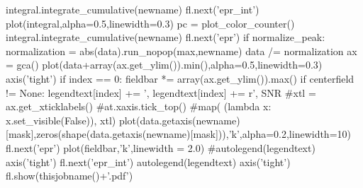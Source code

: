 \begin{tiny}
\begin{python}
   integral.integrate_cumulative(newname)
   fl.next('epr_int')
   plot(integral,alpha=0.5,linewidth=0.3)
   pc = plot_color_counter()
   integral.integrate_cumulative(newname)
   fl.next('epr')
   if normalize_peak:
      normalization = abs(data).run_nopop(max,newname)
      data /= normalization
   ax = gca()
   plot(data+array(ax.get_ylim()).min(),alpha=0.5,linewidth=0.3)
   axis('tight')
   if index == 0:
       fieldbar *= array(ax.get_ylim()).max()
   if centerfield != None:
      legendtext[index] += ', %
   legendtext[index] += r', SNR %
#xtl = ax.get_xticklabels()
#at.xaxis.tick_top()
#map( (lambda x: x.set_visible(False)), xtl)
plot(data.getaxis(newname)[mask],zeros(shape(data.getaxis(newname)[mask])),'k',alpha=0.2,linewidth=10)
fl.next('epr')
plot(fieldbar,'k',linewidth = 2.0)
#autolegend(legendtext)
axis('tight')
fl.next('epr_int')
autolegend(legendtext)
axis('tight')
fl.show(thisjobname()+'.pdf')
\end{python}
\end{tiny}




